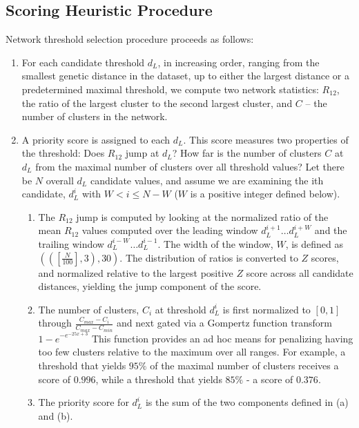 \documentclass[utf8]{FrontiersinHarvard} %
\begin{document}
\subsection{Scoring Heuristic Procedure}

Network threshold selection procedure proceeds as follows:

\begin{enumerate}
  \item{For each candidate threshold $d_L$, in increasing order, ranging from the smallest genetic distance in the dataset, up to either the largest distance or a predetermined maximal threshold, we compute two network statistics: $R_{12}$, the ratio of the largest cluster to the second largest cluster, and $C$ – the number of clusters in the network.}

  \item{ A priority score is assigned to each $d_L$. This score measures two properties of the threshold: Does $R_{12}$ jump at $d_L$? How far is the number of clusters $C$ at $d_L$ from the maximal number of clusters over all threshold values? Let there be $N$ overall $d_L$ candidate values, and assume we are examining the ith candidate, $d_L^i$ with $W < i \leq N - W$ ($W$ is a positive integer defined below).

  \begin{enumerate}
    \item{The $R_{12}$ jump is computed by looking at the normalized ratio of the mean $R_{12}$ values computed over the leading window $d_L^{i+1}…d_L^{i+W}$ and the trailing window $d_L^{i-W}… d_L^{i-1}$. The width of the window, $W$, is defined as $(([\frac{N}{100}],3),30)$. The distribution of ratios is converted to $Z$ scores, and normalized relative to the largest positive $Z$ score across all candidate distances, yielding the jump component of the score.}
    \item{The number of clusters, $C_i$ at threshold $d_L^i$ is first normalized to $[0,1]$ through $\frac{{C_{max} - C_i}}{{C_{max} -C_{min}}}$ and next gated via a Gompertz function transform ${1-e}^{-e^{-25x+3}}$ This function provides an ad hoc means for penalizing having too few clusters relative to the maximum over all ranges. For example, a threshold that yields $95\%$ of the maximal number of clusters receives a score of $0.996$, while a threshold that yields $85\%$ - a score of $0.376$.}
    \item{The priority score for $d_L^i$ is the sum of the two components defined in (a) and (b).}
  \end{enumerate}}



\end{enumerate}
\end{document}
